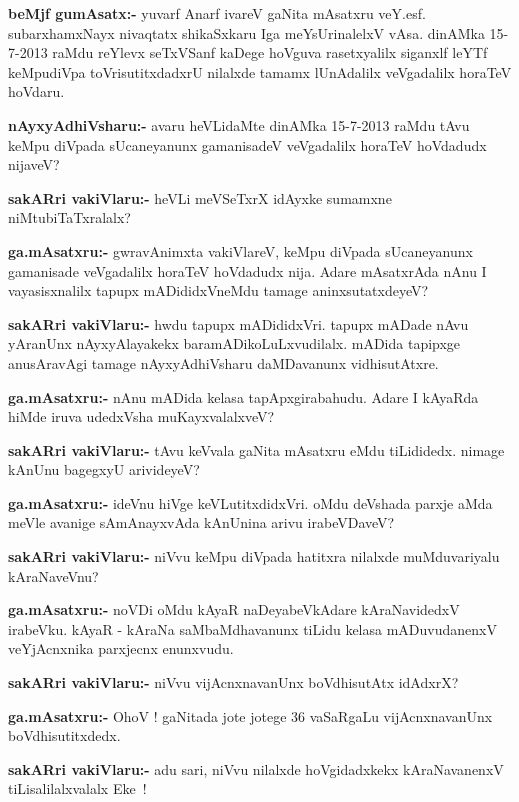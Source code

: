 \smallskip
\noindent
\textbf{beMjf gumAsatx:-} yuvarf Anarf ivareV gaNita mAsatxru veY.esf. subarxhamxNayx nivaqtatx shikaSxkaru Iga meYsUrinalelxV vAsa. dinAMka {\rm 15-7-2013} raMdu reYlevx seTxVSanf kaDege hoVguva rasetxyalilx siganxlf leYTf keMpudiVpa toVrisutitxdadxrU nilalxde tamamx lUnAdalilx veVgadalilx horaTeV hoVdaru.

\smallskip
\smallskip
\noindent
\textbf{nAyxyAdhiVsharu:-} avaru heVLidaMte dinAMka {\rm 15-7-2013} raMdu tAvu keMpu diVpada sUcaneyanunx gamanisadeV veVgadalilx horaTeV hoVdadudx nijaveV?

\smallskip
\noindent
\textbf{sakARri vakiVlaru:-} heVLi meVSeTxrX idAyxke sumamxne niMtubiTaTxralalx?

\smallskip
\noindent
\textbf{ga.mAsatxru:-} gwravAnimxta vakiVlareV, keMpu diVpada sUcaneyanunx gamanisade veVgadalilx horaTeV hoVdadudx nija. Adare mAsatxrAda nAnu I vayasisxnalilx tapupx mADididxV\-neMdu tamage aninxsutatxdeyeV?

\smallskip
\noindent
\textbf{sakARri vakiVlaru:-} hwdu tapupx mADididxVri. tapupx mADade nAvu yAranUnx nAyxyAlayakekx baramADikoLuLxvudilalx. mADida tapipxge anusAravAgi tamage nAyxyAdhiVsharu daMDavanunx vidhisutAtxre.

\smallskip
\noindent
\textbf{ga.mAsatxru:-} nAnu mADida kelasa tapApxgirabahudu. Adare I kAyaRda hiMde iruva udedxVsha muKayxvalalxveV?

\smallskip
\noindent
\textbf{sakARri vakiVlaru:-} tAvu keVvala gaNita mAsatxru eMdu tiLididedx. nimage kAnUnu bagegxyU arivideyeV?

\smallskip
\noindent
\textbf{ga.mAsatxru:-} ideVnu hiVge keVLutitxdidxVri. oMdu deVshada parxje aMda meVle avanige sAmAnayxvAda kAnUnina arivu irabeVDaveV?

\smallskip
\noindent
\textbf{sakARri vakiVlaru:-} niVvu keMpu diVpada hatitxra nilalxde muMduvariyalu kAraNaveVnu?

\smallskip
\noindent
\textbf{ga.mAsatxru:-} noVDi oMdu kAyaR naDeyabeVkAdare kAraNavidedxV irabeVku. kAyaR - kAraNa saMbaMdhavanunx tiLidu kelasa mADuvudanenxV veYjAcnxnika parxjecnx enunxvudu.

\smallskip
\noindent
\textbf{sakARri vakiVlaru:-} niVvu vijAcnxnavanUnx boVdhisutAtx idAdxrX?

\smallskip
\noindent
\textbf{ga.mAsatxru:-} OhoV ! gaNitada jote jotege {\rm 36} vaSaRgaLu vijAcnxnavanUnx boVdhisutitxdedx.

\smallskip
\noindent
\textbf{sakARri vakiVlaru:-} adu sari, niVvu nilalxde hoVgidadxkekx kAraNavanenxV tiLisalilalxvalalx Eke~!

